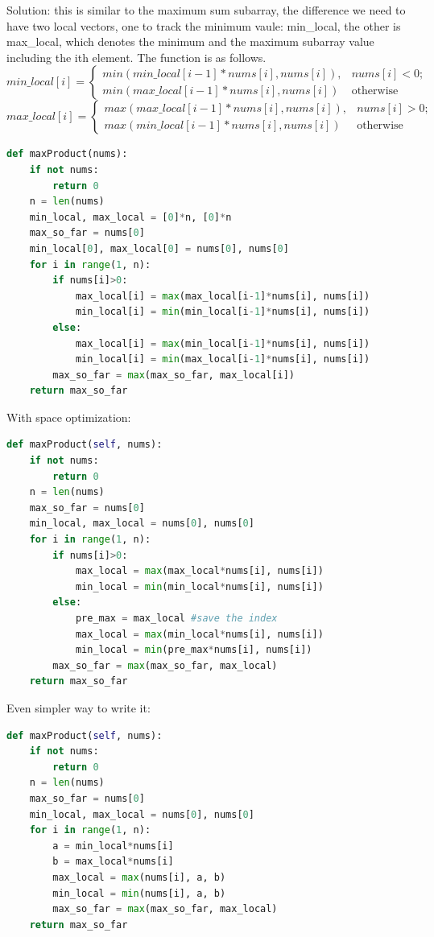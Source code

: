 \documentclass[../main.tex]{subfiles}
\begin{document}
\begin{enumerate}
Solution: this is similar to the maximum sum subarray, the difference we need to have two local vectors, one to track the minimum vaule: min\_local, the other is max\_local, which denotes the minimum and the maximum subarray value including the ith element. The function is as follows. 
\begin{equation}
    min\_local[i] = \begin{cases}
    min(min\_local[i-1]*nums[i], nums[i]),& nums[i]<0;\\
    min(max\_local[i-1]*nums[i], nums[i])& \text{otherwise}
    \end{cases}
\end{equation}
\begin{equation}
    max\_local[i] = \begin{cases}
    max(max\_local[i-1]*nums[i], nums[i]),& nums[i]>0;\\
    max(min\_local[i-1]*nums[i], nums[i])& \text{otherwise}
    \end{cases}
\end{equation}
\begin{lstlisting}[language = Python]
def maxProduct(nums):
    if not nums:
        return 0
    n = len(nums)
    min_local, max_local = [0]*n, [0]*n
    max_so_far = nums[0]
    min_local[0], max_local[0] = nums[0], nums[0]
    for i in range(1, n):
        if nums[i]>0:
            max_local[i] = max(max_local[i-1]*nums[i], nums[i])
            min_local[i] = min(min_local[i-1]*nums[i], nums[i])
        else:
            max_local[i] = max(min_local[i-1]*nums[i], nums[i])
            min_local[i] = min(max_local[i-1]*nums[i], nums[i])
        max_so_far = max(max_so_far, max_local[i])
    return max_so_far
\end{lstlisting}
With space optimization:
\begin{lstlisting}[language = Python]
def maxProduct(self, nums):
    if not nums:
        return 0
    n = len(nums)
    max_so_far = nums[0]
    min_local, max_local = nums[0], nums[0]
    for i in range(1, n):
        if nums[i]>0:
            max_local = max(max_local*nums[i], nums[i])
            min_local = min(min_local*nums[i], nums[i])
        else:
            pre_max = max_local #save the index
            max_local = max(min_local*nums[i], nums[i])
            min_local = min(pre_max*nums[i], nums[i])
        max_so_far = max(max_so_far, max_local)
    return max_so_far
\end{lstlisting}
Even simpler way to write it:
\begin{lstlisting}[language = Python]
def maxProduct(self, nums):
    if not nums:
        return 0
    n = len(nums)
    max_so_far = nums[0]
    min_local, max_local = nums[0], nums[0]
    for i in range(1, n):
        a = min_local*nums[i]
        b = max_local*nums[i]
        max_local = max(nums[i], a, b)
        min_local = min(nums[i], a, b)
        max_so_far = max(max_so_far, max_local)
    return max_so_far
\end{lstlisting}


\end{enumerate}
\end{document}

